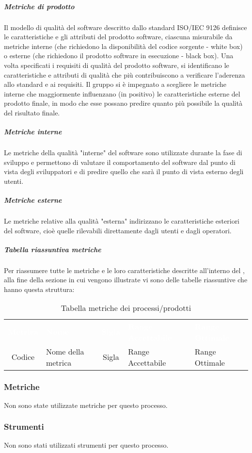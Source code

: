 \subparagraph*{Metriche di prodotto}
Il modello di qualità del software descritto dallo standard ISO/IEC 9126 definisce le caratteristiche e gli attributi del prodotto software, ciascuna misurabile da metriche interne (che richiedono la disponibilità del codice sorgente - white box) o esterne (che richiedono il prodotto software in esecuzione - black box).
Una volta specificati i requisiti di qualità del prodotto software, si identificano le caratteristiche e attributi di qualità che più contribuiscono a verificare l'aderenza allo standard e ai requisiti.
Il gruppo \Gruppo{} si è impegnato a scegliere le metriche interne che maggiormente influenzano (in positivo) le caratteristiche esterne del prodotto finale, in modo che esse possano predire quanto più possibile la qualità del risultato finale. 

\subparagraph*{Metriche interne}
Le metriche della qualità "interne" del software sono utilizzate durante la fase di sviluppo e permettono di valutare il comportamento del software dal punto di vista degli sviluppatori e di predire quello che sarà il punto di vista esterno degli utenti.
      
\subparagraph*{Metriche esterne}
Le metriche relative alla qualità "esterna" indirizzano le caratteristiche esteriori del software, cioè quelle rilevabili direttamente dagli utenti e dagli operatori.

\subparagraph*{Tabella riassuntiva metriche}
Per riassumere tutte le metriche e le loro caratteristiche descritte all'interno del \PdQ{}, alla fine della sezione in cui vengono illustrate vi sono delle tabelle riassuntive che hanno questa struttura:
{
\renewcommand{\arraystretch}{1.5}
\begin{longtable}{ c C{4cm} c C{3.5cm} C{3.5cm}}
\caption{Tabella metriche dei processi/prodotti}\\
\textcolor{white}{\textbf{Metrica}} & \textcolor{white}{\textbf{Nome}} & \textcolor{white}{\textbf{Sigla}} & \textcolor{white}{\textbf{Range Accettabile}} & \textcolor{white}{\textbf{Range Ottimale}}\\
Codice & Nome della metrica & Sigla & Range Accettabile & Range Ottimale \\
\end{longtable}
}
\subsubsection{Metriche}
Non sono state utilizzate metriche per questo processo.
\subsubsection{Strumenti}
Non sono stati utilizzati strumenti per questo processo.